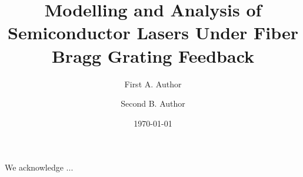 \documentclass[
  reprint,            %
  amsmath,amssymb,    %
  aps,pre             %
]{revtex4-2}
\begin{document}

\title{Modelling and Analysis of Semiconductor Lasers Under Fiber Bragg Grating Feedback}

\author{First A. Author}
\author{Second B. Author}
\date{\today}





\maketitle





\begin{acknowledgments}
We acknowledge ...
\end{acknowledgments}

\appendix


\end{document}
